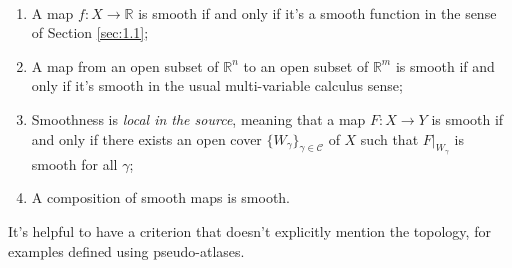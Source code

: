 \documentclass[a4paper,11pt]{article}
\begin{document}
	\begin{lem}
		\
		\begin{enumerate}
			\item A map $f: X \to \mathbb{R}$ is smooth if and only if it's a smooth function in the sense of Section \ref{sec:1.1};
			\item A map from an open subset of $\mathbb{R}^n$ to an open subset of $\mathbb{R}^m$ is smooth if and only if it's smooth in the usual multi-variable calculus sense;
			\item Smoothness is \emph{local in the source}, meaning that a map $F: X \to Y$ is smooth if and only if there exists an open cover $\{W_\gamma\}_{\gamma\in \mathcal{C}}$ of $X$ such that $F|_{W_\gamma}$ is smooth for all $\gamma$;
			\item A composition of smooth maps is smooth.
		\end{enumerate}
	\end{lem}
	
	It's helpful to have a criterion that doesn't explicitly mention the topology, for examples defined using pseudo-atlases.
\end{document}
